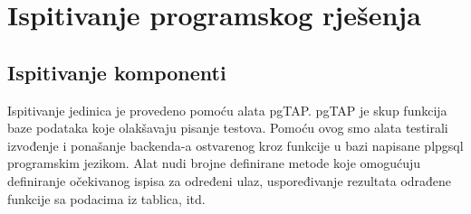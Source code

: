 			\eject 
		
	
		\section{Ispitivanje programskog rješenja}
			
			\subsection{Ispitivanje komponenti}
				Ispitivanje jedinica je provedeno pomoću alata pgTAP. pgTAP je skup funkcija baze podataka koje olakšavaju pisanje testova. Pomoću ovog smo alata testirali izvođenje i ponašanje backenda-a ostvarenog kroz funkcije u bazi napisane plpgsql programskim jezikom. Alat nudi brojne definirane metode koje omogućuju definiranje očekivanog ispisa za određeni ulaz, uspoređivanje rezultata odrađene funkcije sa podacima iz tablica, itd.
				\eject
